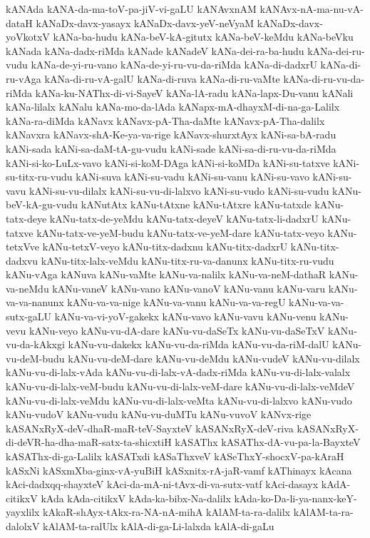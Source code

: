 {kANAda
kANA-da-ma-toV-pa-jiV-vi-gaLU
kANAvxnAM
kANAvx-nA-ma-nu-vA-dataH
kANaDx-davx-yasayx
kANaDx-davx-yeV-neVyaM
kANaDx-davx-yoVkotxV
kANa-ba-hudu
kANa-beV-kA-gitutx
kANa-beV-keMdu
kANa-beVku
kANada
kANa-dadx-riMda
kANade
kANadeV
kANa-dei-ra-ba-hudu
kANa-dei-ru-vudu
kANa-de-yi-ru-vano
kANa-de-yi-ru-vu-da-riMda
kANa-di-dadxrU
kANa-di-ru-vAga
kANa-di-ru-vA-galU
kANa-di-ruva
kANa-di-ru-vaMte
kANa-di-ru-vu-da-riMda
kANa-ku-NAThx-di-vi-SayeV
kANa-lA-radu
kANa-lapx-Du-vanu
kANali
kANa-lilalx
kANalu
kANa-mo-da-lAda
kANapx-mA-dhayxM-di-na-ga-Lalilx
kANa-ra-diMda
kANavx
kANavx-pA-Tha-daMte
kANavx-pA-Tha-dalilx
kANavxra
kANavx-shA-Ke-ya-va-rige
kANavx-shurxtAyx
kANi-sa-bA-radu
kANi-sada
kANi-sa-daM-tA-gu-vudu
kANi-sade
kANi-sa-di-ru-vu-da-riMda
kANi-si-ko-LuLx-vavo
kANi-si-koM-DAga
kANi-si-koMDa
kANi-su-tatxve
kANi-su-titx-ru-vudu
kANi-suva
kANi-su-vadu
kANi-su-vanu
kANi-su-vavo
kANi-su-vavu
kANi-su-vu-dilalx
kANi-su-vu-di-lalxvo
kANi-su-vudo
kANi-su-vudu
kANu-beV-kA-gu-vudu
kANutAtx
kANu-tAtxne
kANu-tAtxre
kANu-tatxde
kANu-tatx-deye
kANu-tatx-de-yeMdu
kANu-tatx-deyeV
kANu-tatx-li-dadxrU
kANu-tatxve
kANu-tatx-ve-yeM-budu
kANu-tatx-ve-yeM-dare
kANu-tatx-veyo
kANu-tetxVve
kANu-tetxV-veyo
kANu-titx-dadxnu
kANu-titx-dadxrU
kANu-titx-dadxvu
kANu-titx-lalx-veMdu
kANu-titx-ru-va-danunx
kANu-titx-ru-vudu
kANu-vAga
kANuva
kANu-vaMte
kANu-va-nalilx
kANu-va-neM-dathaR
kANu-va-neMdu
kANu-vaneV
kANu-vano
kANu-vanoV
kANu-vanu
kANu-varu
kANu-va-va-nanunx
kANu-va-va-nige
kANu-va-vanu
kANu-va-va-regU
kANu-va-va-sutx-gaLU
kANu-va-vi-yoV-gakekx
kANu-vavo
kANu-vavu
kANu-venu
kANu-vevu
kANu-veyo
kANu-vu-dA-dare
kANu-vu-daSeTx
kANu-vu-daSeTxV
kANu-vu-da-kAkxgi
kANu-vu-dakekx
kANu-vu-da-riMda
kANu-vu-da-riM-dalU
kANu-vu-deM-budu
kANu-vu-deM-dare
kANu-vu-deMdu
kANu-vudeV
kANu-vu-dilalx
kANu-vu-di-lalx-vAda
kANu-vu-di-lalx-vA-dadx-riMda
kANu-vu-di-lalx-valalx
kANu-vu-di-lalx-veM-budu
kANu-vu-di-lalx-veM-dare
kANu-vu-di-lalx-veMdeV
kANu-vu-di-lalx-veMdu
kANu-vu-di-lalx-veMta
kANu-vu-di-lalxvo
kANu-vudo
kANu-vudoV
kANu-vudu
kANu-vu-duMTu
kANu-vuvoV
kANvx-rige
kASANxRyX-deV-dhaR-maR-teV-SayxteV
kASANxRyX-deV-riva
kASANxRyX-di-deVR-ha-dha-maR-satx-ta-shicxtiH
kASAThx
kASAThx-dA-vu-pa-la-BayxteV
kASAThx-di-ga-Lalilx
kASATxdi
kASaThxveV
kASeThxY-shocxV-pa-kAraH
kASxNi
kASxmXba-ginx-vA-yuBiH
kASxnitx-rA-jaR-vamf
kAThinayx
kAcana
kAci-dadxqq-shayxteV
kAci-da-mA-ni-tAvx-di-va-sutx-vatf
kAci-dasayx
kAdA-citikxV
kAda
kAda-citikxV
kAda-ka-bibx-Na-dalilx
kAda-ko-Da-li-ya-nanx-keY-yayxlilx
kAkaR-shAyx-tAkx-ra-NA-nA-mihA
kAlAM-ta-ra-dalilx
kAlAM-ta-ra-dalolxV
kAlAM-ta-ralUlx
kAlA-di-ga-Li-lalxda
kAlA-di-gaLu
}
